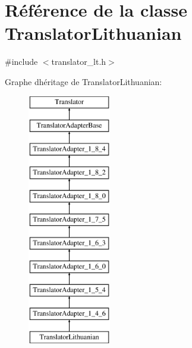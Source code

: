 \hypertarget{class_translator_lithuanian}{}\section{Référence de la classe Translator\+Lithuanian}
\label{class_translator_lithuanian}


{\ttfamily \#include $<$translator\+\_\+lt.\+h$>$}

Graphe d\textquotesingle{}héritage de Translator\+Lithuanian\+:\begin{figure}[H]
\begin{center}
\leavevmode
\includegraphics[height=11.000000cm]{class_translator_lithuanian}
\end{center}
\end{figure}
